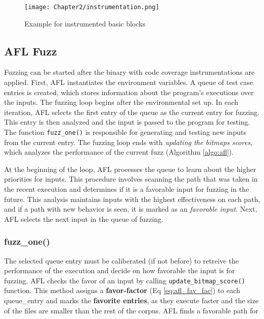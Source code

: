 \begin{figure}[htpb]
    \texttt{[image: Chapter2/instrumentation.png]}
    \centering
    \captionsetup{justification=centering}
    \caption{Example for instrumented basic blocks}
    \label{fig:instrumentation}
\end{figure}

\subsection{AFL Fuzz}

Fuzzing can be started after the binary with code coverage instrumentations are applied. First, AFL instantiates the environment variables. A queue of test case entries is created, which stores information about the program's executions over the inputs. The fuzzing loop begins after the environmental set up. In each iteration, AFL selects the first entry of the queue as the current entry for fuzzing. This entry is then analyzed and the input is passed to the program for testing. The function \texttt{fuzz\_one()} is responsible for generating and testing new inputs from the current entry. The fuzzing loop ends with \textit{updating the bitmaps scores}, which analyzes the performance of the current fuzz (Algorithm \ref{algo:afl}).



At the beginning of the loop, AFL processes the queue to learn about the higher priorities for inputs. This procedure involves scanning the path that was taken in the recent execution and determines if it is a favorable input for fuzzing in the future. This analysis maintains inputs with the highest effectiveness on each path, and if a path with new behavior is seen, it is marked as an \textit{favorable input}. Next, AFL selects the next input in the queue of fuzzing.

\subsubsection{fuzz\_one()}



The selected queue entry must be caliberated (if not before) to retreive the performance of the execution and decide on how favorable the input is for fuzzing. AFL checks the favor of an input by calling \texttt{update\_bitmap\_score()} function. This method assigns a \textbf{favor-factor} (Eq \ref{eq:afl_fav_fac}) to each queue\_entry and marks the \textbf{favorite entries}, as they execute faster and the size of the files are smaller than the rest of the corpus. AFL finds a favorable path for  \cite{afl_git} 

